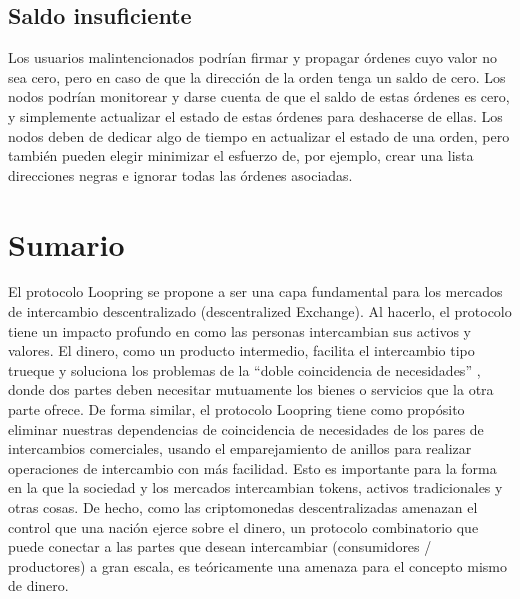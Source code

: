\documentclass[UTF8,nofonts]{article}
\begin{document}
\begin{multicols}{2}
\subsection{Saldo insuficiente}
Los usuarios malintencionados podr\'ian firmar y propagar \'ordenes cuyo valor no sea cero, pero en caso de que la direcci\'on de la orden tenga un saldo de cero. Los nodos podr\'ian monitorear y darse cuenta de que el saldo de estas \'ordenes es cero, y simplemente actualizar el estado de estas \'ordenes para deshacerse de ellas. Los nodos deben de dedicar algo de tiempo en actualizar el estado de una orden, pero tambi\'en pueden elegir minimizar el esfuerzo de, por ejemplo, crear una lista direcciones negras e ignorar todas las \'ordenes asociadas.

\section{Sumario}
El protocolo Loopring se propone a ser una capa fundamental para los mercados de intercambio descentralizado (descentralized Exchange). Al hacerlo, el protocolo tiene un impacto profundo en como las personas intercambian sus activos y valores. El dinero, como un producto intermedio, facilita el intercambio tipo trueque y soluciona los problemas de la \enquote{doble coincidencia de necesidades} \cite{unenumerated2006}, donde dos partes deben necesitar mutuamente los bienes o servicios que la otra parte ofrece. De forma similar, el protocolo Loopring tiene como prop\'osito eliminar nuestras dependencias de coincidencia de necesidades de los pares de intercambios comerciales, usando el emparejamiento de anillos para realizar operaciones de intercambio con m\'as facilidad. Esto es importante para la forma en la que la sociedad y los mercados intercambian tokens, activos tradicionales y otras cosas. De hecho, como las criptomonedas descentralizadas amenazan el control que una naci\'on ejerce sobre el dinero, un protocolo combinatorio que puede conectar a las partes que desean intercambiar (consumidores / productores) a gran escala, es te\'oricamente una amenaza para el concepto mismo de dinero.


\end{multicols}
\end{document}
